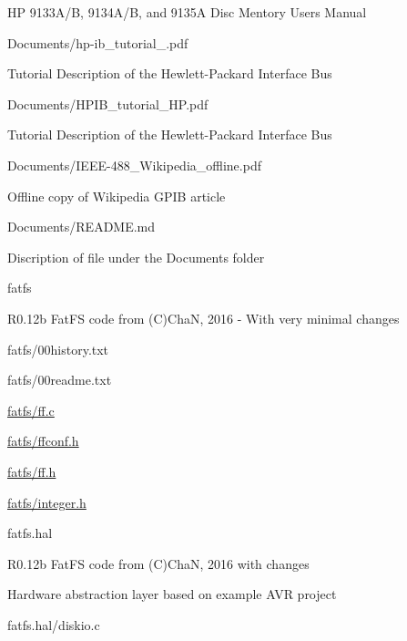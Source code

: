 \begin{DoxyItemize}
\begin{DoxyItemize}
\item HP 9133\+A/B, 9134\+A/B, and 9135A Disc Mentory Users Manual
\end{DoxyItemize}
\item Documents/hp-\/ib\+\_\+tutorial\+\_.\+pdf
\begin{DoxyItemize}
\item Tutorial Description of the Hewlett-\/\+Packard Interface Bus
\end{DoxyItemize}
\item Documents/\+H\+P\+I\+B\+\_\+tutorial\+\_\+\+H\+P.\+pdf
\begin{DoxyItemize}
\item Tutorial Description of the Hewlett-\/\+Packard Interface Bus
\end{DoxyItemize}
\item Documents/\+I\+E\+E\+E-\/488\+\_\+\+Wikipedia\+\_\+offline.\+pdf
\begin{DoxyItemize}
\item Offline copy of Wikipedia G\+P\+IB article
\end{DoxyItemize}
\item Documents/\+R\+E\+A\+D\+M\+E.\+md
\begin{DoxyItemize}
\item Discription of file under the Documents folder
\end{DoxyItemize}
\item fatfs
\begin{DoxyItemize}
\item R0.\+12b Fat\+FS code from (C)ChaN, 2016 -\/ With very minimal changes
\item fatfs/00history.\+txt
\item fatfs/00readme.\+txt
\item \hyperlink{ff_8c}{fatfs/ff.\+c}
\item \hyperlink{ffconf_8h}{fatfs/ffconf.\+h}
\item \hyperlink{ff_8h}{fatfs/ff.\+h}
\item \hyperlink{integer_8h}{fatfs/integer.\+h}
\end{DoxyItemize}
\item fatfs.\+hal
\begin{DoxyItemize}
\item R0.\+12b Fat\+FS code from (C)ChaN, 2016 with changes
\item Hardware abstraction layer based on example A\+VR project
\item fatfs.\+hal/diskio.c

\end{DoxyItemize}
\end{DoxyItemize}

